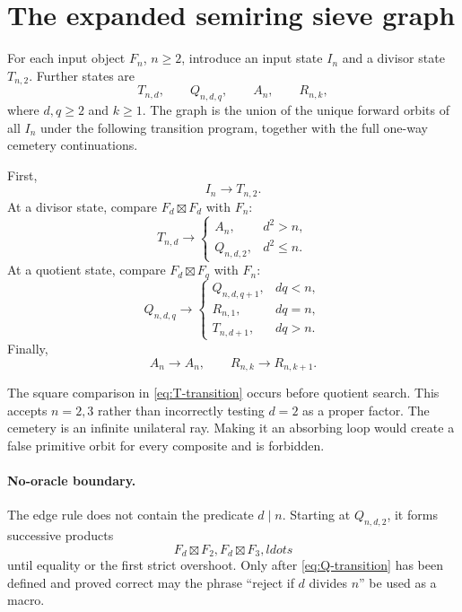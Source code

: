 \section{The expanded semiring sieve graph}
\label{sec:graph}

For each input object $F_n$, $n\ge2$, introduce an input state $I_n$ and a
divisor state $T_{n,2}$.  Further states are
\[
T_{n,d},\qquad Q_{n,d,q},\qquad A_n,\qquad R_{n,k},
\]
where $d,q\ge2$ and $k\ge1$.  The graph is the union of the unique forward
orbits of all $I_n$ under the following transition program, together with
the full one-way cemetery continuations.

First,
\[
I_n\longrightarrow T_{n,2}.
\]
At a divisor state, compare $F_d\boxtimes F_d$ with $F_n$:
\begin{equation}
T_{n,d}\longrightarrow
\begin{cases}
A_n,&d^2>n,\\
Q_{n,d,2},&d^2\le n.
\end{cases}
\label{eq:T-transition}
\end{equation}
At a quotient state, compare $F_d\boxtimes F_q$ with $F_n$:
\begin{equation}
Q_{n,d,q}\longrightarrow
\begin{cases}
Q_{n,d,q+1},&dq<n,\\
R_{n,1},&dq=n,\\
T_{n,d+1},&dq>n.
\end{cases}
\label{eq:Q-transition}
\end{equation}
Finally,
\begin{equation}
A_n\longrightarrow A_n,
\qquad
R_{n,k}\longrightarrow R_{n,k+1}.
\label{eq:terminal-transitions}
\end{equation}

The square comparison in \eqref{eq:T-transition} occurs before quotient
search.  This accepts $n=2,3$ rather than incorrectly testing $d=2$ as a
proper factor.  The cemetery is an infinite unilateral ray.  Making it an
absorbing loop would create a false primitive orbit for every composite and
is forbidden.

\paragraph{No-oracle boundary.}
The edge rule does not contain the predicate $d\mid n$.  Starting at
$Q_{n,d,2}$, it forms successive products
\[
F_d\boxtimes F_2, F_d\boxtimes F_3,ldots
\]
until equality or the first strict overshoot.  Only after
\eqref{eq:Q-transition} has been defined and proved correct may the phrase
``reject if $d$ divides $n$'' be used as a macro.

